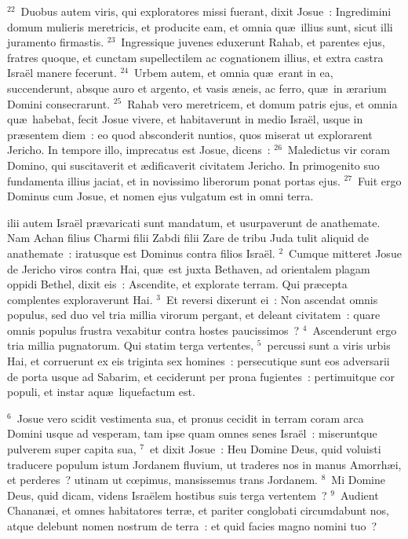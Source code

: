 ${}^{22}$~Duobus autem viris, qui exploratores missi fuerant, dixit Josue~: Ingredimini domum mulieris meretricis, et producite eam, et omnia qu\ae\ illius sunt, sicut illi juramento firmastis.
${}^{23}$~Ingressique juvenes eduxerunt Rahab, et parentes ejus, fratres quoque, et cunctam supellectilem ac cognationem illius, et extra castra Isra\"el manere fecerunt.
${}^{24}$~Urbem autem, et omnia qu\ae\ erant in ea, succenderunt, absque auro et argento, et vasis \ae neis, ac ferro, qu\ae\ in \ae rarium Domini consecrarunt.
${}^{25}$~Rahab vero meretricem, et domum patris ejus, et omnia qu\ae\ habebat, fecit Josue vivere, et habitaverunt in medio Isra\"el, usque in pr\ae sentem diem~: eo quod absconderit nuntios, quos miserat ut explorarent Jericho. In tempore illo, imprecatus est Josue, dicens~:
${}^{26}$~Maledictus vir coram Domino, qui suscitaverit et \ae dificaverit civitatem Jericho. In primogenito suo fundamenta illius jaciat, et in novissimo liberorum ponat portas ejus.
${}^{27}$~Fuit ergo Dominus cum Josue, et nomen ejus vulgatum est in omni terra.

\bchapter
{}ilii autem Isra\"el pr\ae varicati sunt mandatum, et usurpaverunt de anathemate. Nam Achan filius Charmi filii Zabdi filii Zare de tribu Juda tulit aliquid de anathemate~: iratusque est Dominus contra filios Isra\"el.
${}^{2}$~Cumque mitteret Josue de Jericho viros contra Hai, qu\ae\ est juxta Bethaven, ad orientalem plagam oppidi Bethel, dixit eis~: Ascendite, et explorate terram. Qui pr\ae cepta complentes exploraverunt Hai.
${}^{3}$~Et reversi dixerunt ei~: Non ascendat omnis populus, sed duo vel tria millia virorum pergant, et deleant civitatem~: quare omnis populus frustra vexabitur contra hostes paucissimos~?
${}^{4}$~Ascenderunt ergo tria millia pugnatorum. Qui statim terga vertentes,
${}^{5}$~percussi sunt a viris urbis Hai, et corruerunt ex eis triginta sex homines~: persecutique sunt eos adversarii de porta usque ad Sabarim, et ceciderunt per prona fugientes~: pertimuitque cor populi, et instar aqu\ae\ liquefactum est.


${}^{6}$~Josue vero scidit vestimenta sua, et pronus cecidit in terram coram arca Domini usque ad vesperam, tam ipse quam omnes senes Isra\"el~: miseruntque pulverem super capita sua,
${}^{7}$~et dixit Josue~: Heu Domine Deus, quid voluisti traducere populum istum Jordanem fluvium, ut traderes nos in manus Amorrh\ae i, et perderes~? utinam ut cœpimus, mansissemus trans Jordanem.
${}^{8}$~Mi Domine Deus, quid dicam, videns Isra\"elem hostibus suis terga vertentem~?
${}^{9}$~Audient Chanan\ae i, et omnes habitatores terr\ae , et pariter conglobati circumdabunt nos, atque delebunt nomen nostrum de terra~: et quid facies magno nomini tuo~?


